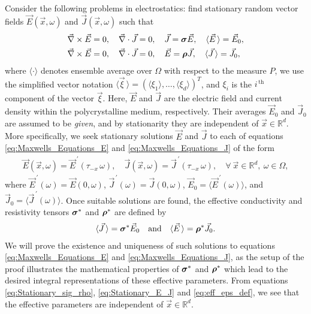 \documentclass[11pt]{amsart}
\newcommand\bsig{\mbox{\boldmath${\sigma}$}}
\newcommand\brho{\mbox{\boldmath${\rho}$}}
\begin{document}
Consider the following problems in electrostatics: find stationary
random vector fields $\vec{E}(\vec{x},\omega)$ and $\vec{J}(\vec{x},\omega)$
such that
%
\begin{align}   \label{eq:Maxwells_Equations_E}  
 &\vec{\nabla}\times\vec{E}=0, \quad
  \vec{\nabla}\cdot\vec{J}=0,\quad
  \vec{J}=\bsig\vec{E},\quad
  \langle\vec{E}\,\rangle=\vec{E}_0, \\
%
  \label{eq:Maxwells_Equations_J}
   &\vec{\nabla}\times\vec{E}=0, \quad
   \vec{\nabla}\cdot\vec{J}=0, \quad
   \vec{E}=\brho\vec{J},\quad
   \langle\vec{J}\,\rangle=\vec{J}_0,
\end{align}
%
where $\langle\cdot\rangle$ denotes ensemble average over $\Omega$ with respect to the
measure $P$,
we use the
simplified vector notation $\langle\vec{\xi}\,\rangle=(\langle\xi_1\rangle,\ldots,\langle\xi_d\rangle)^T$, and $\xi_i$ is
the $i^{\,\text{th}}$ component of the vector $\vec{\xi}$. Here,
$\vec{E}$ and $\vec{J}$ are the electric field and current density within
the polycrystalline medium, respectively. Their averages $\vec{E}_0$
and $\vec{J}_0$ are assumed to be \emph{given}, and by stationarity they are
independent of $\vec{x}\in\mathbb{R}^d$.  More specifically, we seek
stationary solutions $\vec{E}$ and $\vec{J}$ to each of equations
\eqref{eq:Maxwells_Equations_E} and \eqref{eq:Maxwells_Equations_J} of
the form    
%
\begin{align}\label{eq:Stationary_E_J}
  \vec{E}(\vec{x},\omega)=\vec{E}^{\,\prime}(\tau_{-x}\,\omega), \quad
  \vec{J}(\vec{x},\omega)=\vec{J}^{\,\prime}(\tau_{-x}\,\omega), \quad
  \forall \ \vec{x}\in\mathbb{R}^d, \ \omega\in\Omega,
\end{align}
%
where $\vec{E}^{\,\prime}(\omega)=\vec{E}(0,\omega)$, $\vec{J}^{\,\prime}(\omega)=\vec{J}(0,\omega)$,
$\vec{E}_0=\langle\vec{E}^{\,\prime}(\omega)\rangle$, and
$\vec{J}_0=\langle\vec{J}^{\,\prime}(\omega)\rangle$. Once suitable solutions are 
found, the effective conductivity and resistivity tensors $\bsig^*$
and $\brho^*$ are defined by \cite{Golden:CMP-473}    
%
\begin{align}\label{eq:eff_eps_def}
    \langle \vec{J} \,\rangle=  \bsig^* \vec{E}_0
    \quad \text{and} \quad    
    \langle \vec{E} \,\rangle=  \brho^*\vec{J}_0.
\end{align}
%
We will prove the existence and uniqueness of such solutions to equations
\eqref{eq:Maxwells_Equations_E} and \eqref{eq:Maxwells_Equations_J},
as the setup of the proof illustrates the mathematical properties of
$\bsig^*$ and $\brho^*$ which lead to the desired integral
representations of these effective parameters. From equations
\eqref{eq:Stationary_sig_rho}, \eqref{eq:Stationary_E_J} and
\eqref{eq:eff_eps_def}, we see that the effective parameters are
independent of $\vec{x}\in\mathbb{R}^d$.  
\end{document}

